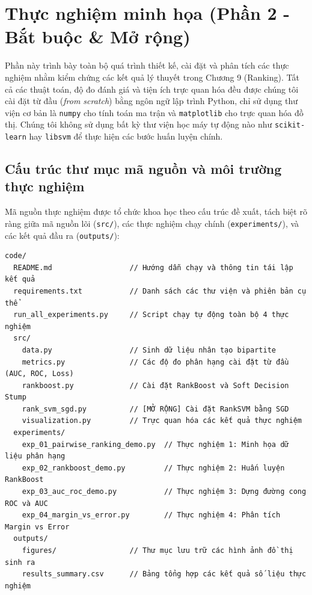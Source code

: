 \section{Thực nghiệm minh họa (Phần 2 - Bắt buộc \& Mở rộng)}
\label{sec:experiments}

Phần này trình bày toàn bộ quá trình thiết kế, cài đặt và phân tích các thực nghiệm nhằm kiểm chứng các kết quả lý thuyết trong Chương 9 (Ranking). Tất cả các thuật toán, độ đo đánh giá và tiện ích trực quan hóa đều được chúng tôi cài đặt từ đầu (\textit{from scratch}) bằng ngôn ngữ lập trình Python, chỉ sử dụng thư viện cơ bản là \texttt{numpy} cho tính toán ma trận và \texttt{matplotlib} cho trực quan hóa đồ thị. Chúng tôi không sử dụng bất kỳ thư viện học máy tự động nào như \texttt{scikit-learn} hay \texttt{libsvm} để thực hiện các bước huấn luyện chính.

\subsection{Cấu trúc thư mục mã nguồn và môi trường thực nghiệm}
Mã nguồn thực nghiệm được tổ chức khoa học theo cấu trúc đề xuất, tách biệt rõ ràng giữa mã nguồn lõi (\texttt{src/}), các thực nghiệm chạy chính (\texttt{experiments/}), và các kết quả đầu ra (\texttt{outputs/}):

\begin{verbatim}
code/
  README.md                  // Hướng dẫn chạy và thông tin tái lập kết quả
  requirements.txt           // Danh sách các thư viện và phiên bản cụ thể
  run_all_experiments.py     // Script chạy tự động toàn bộ 4 thực nghiệm
  src/
    data.py                  // Sinh dữ liệu nhân tạo bipartite
    metrics.py               // Các độ đo phân hạng cài đặt từ đầu (AUC, ROC, Loss)
    rankboost.py             // Cài đặt RankBoost và Soft Decision Stump
    rank_svm_sgd.py          // [MỞ RỘNG] Cài đặt RankSVM bằng SGD
    visualization.py         // Trực quan hóa các kết quả thực nghiệm
  experiments/
    exp_01_pairwise_ranking_demo.py  // Thực nghiệm 1: Minh họa dữ liệu phân hạng
    exp_02_rankboost_demo.py         // Thực nghiệm 2: Huấn luyện RankBoost
    exp_03_auc_roc_demo.py           // Thực nghiệm 3: Dựng đường cong ROC và AUC
    exp_04_margin_vs_error.py        // Thực nghiệm 4: Phân tích Margin vs Error
  outputs/
    figures/                 // Thư mục lưu trữ các hình ảnh đồ thị sinh ra
    results_summary.csv      // Bảng tổng hợp các kết quả số liệu thực nghiệm
\end{verbatim}

